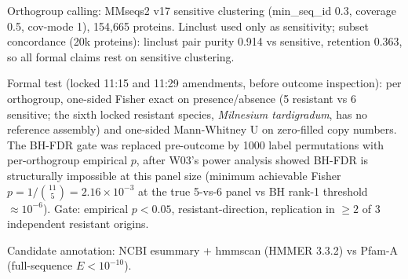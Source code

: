\documentclass[12pt,a4paper]{article}
\begin{document}
Orthogroup calling: MMseqs2 v17 sensitive clustering (min\_seq\_id 0.3, coverage 0.5, cov-mode 1), 154,665 proteins. Linclust used only as sensitivity; subset concordance (20k proteins): linclust pair purity 0.914 vs sensitive, retention 0.363, so all formal claims rest on sensitive clustering.

Formal test (locked 11:15 and 11:29 amendments, before outcome inspection): per orthogroup, one-sided Fisher exact on presence/absence (5 resistant vs 6 sensitive; the sixth locked resistant species, \emph{Milnesium tardigradum}, has no reference assembly) and one-sided Mann-Whitney U on zero-filled copy numbers. The BH-FDR gate was replaced pre-outcome by 1000 label permutations with per-orthogroup empirical $p$, after W03's power analysis showed BH-FDR is structurally impossible at this panel size (minimum achievable Fisher $p = 1/\binom{11}{5} = 2.16\times10^{-3}$ at the true 5-vs-6 panel vs BH rank-1 threshold $\approx 10^{-6}$). Gate: empirical $p<0.05$, resistant-direction, replication in $\geq 2$ of 3 independent resistant origins.

Candidate annotation: NCBI esummary + hmmscan (HMMER 3.3.2) vs Pfam-A (full-sequence $E<10^{-10}$).
\end{document}
